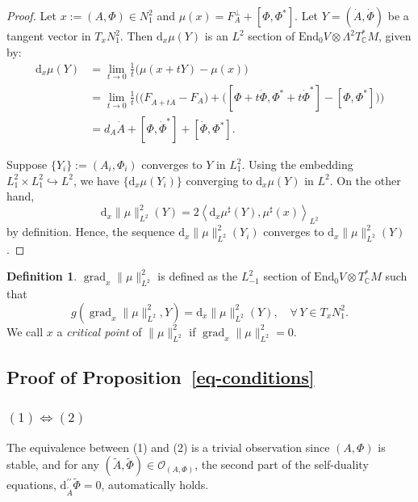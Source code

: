 \documentclass[a4paper]{amsart}
\theoremstyle{definition}
\newtheorem{definition}[theorem]{Definition}
\theoremstyle{remark}
\numberwithin{equation}{section}
\begin{document}
\begin{proof}
Let $x := (A, \Phi) \in N_1^2$ and $\mu(x) = F_A^\perp + [\Phi, \Phi^*]$. Let $Y = (\dot{A}, \dot{\Phi})$ be a tangent vector in $T_x N_1^2$. Then $\mathrm{d}_x \mu(Y)$ is an $L^2$ section of $\mathrm{End}_0 V \otimes \Lambda^2 T^*_{\mathbb{C}} M$, given by:
\begin{align}
\mathrm{d}_x \mu(Y) &= \lim_{t \to 0} \frac{1}{t} \Big( \mu(x + tY) - \mu(x) \Big) \nonumber \\
&= \lim_{t \to 0} \frac{1}{t} \Big( \big(F_{A + t\dot{A}} - F_A\big) + \big([\Phi + t\dot{\Phi}, \Phi^* + t\dot{\Phi}^*] - [\Phi, \Phi^*]\big) \Big) \nonumber \\
&= d_A \dot{A} + [\Phi, \dot{\Phi}^*] + [\dot{\Phi}, \Phi^*]. \label{dmu}
\end{align}

Suppose $\{Y_i\} := (A_i, \Phi_i)$ converges to $Y$ in $L_1^2$. Using the embedding $L_1^2 \times L_1^2 \hookrightarrow L^2$, we have $\{\mathrm{d}_x \mu(Y_i)\}$ converging to $\mathrm{d}_x \mu(Y)$ in $L^2$. On the other hand,
\[
\mathrm{d}_x \|\mu\|^2_{L^2}(Y) = 2 \left\langle \mathrm{d}_x \mu^\sharp(Y), \mu^\sharp(x) \right\rangle_{L^2}
\]
by definition. Hence, the sequence $\mathrm{d}_x \|\mu\|^2_{L^2}(Y_i)$ converges to $\mathrm{d}_x \|\mu\|^2_{L^2}(Y)$.
\end{proof}

\begin{definition}
$\operatorname{grad}_x \|\mu\|_{L^2}^2$ is defined as the $L_{-1}^2$ section of $\mathrm{End}_0 V \otimes  T^*_{\mathbb{C}} M$ such that
\[
g\left(\operatorname{grad}_x \|\mu\|^2_{L^2}, Y\right) = \mathrm{d}_x\|\mu\|^2_{L^2}(Y), \quad \forall \, Y \in T_x N_1^2.
\]
We call $x$ a \textit{critical point} of $\|\mu\|_{L^2}^2$ if
$
\operatorname{grad}_x \|\mu\|_{L^2}^2 = 0.
$
\end{definition}

\subsection{Proof of Proposition~\ref{eq-conditions}}

\subsubsection{$(1) \Leftrightarrow (2)$}
The equivalence between (1) and (2) is a trivial observation since $(A, \Phi)$ is stable, and for any $(\tilde{A}, \tilde{\Phi}) \in \mathcal{O}_{(A, \Phi)}$, the second part of the self-duality equations, $\mathrm{d}_{\tilde{A}}^{\prime\prime} \tilde{\Phi} = 0$, automatically holds.
\end{document}
